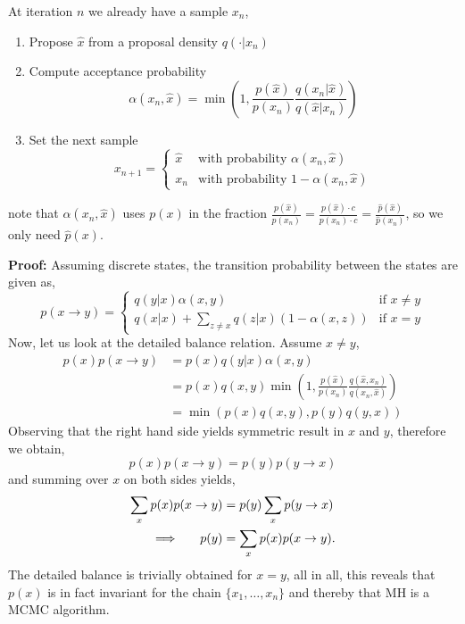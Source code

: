 \begin{testexample}
     At iteration $n$ we already have a sample $x_n$,
    \begin{enumerate}
        \item Propose $\hat x$ from a proposal density $q(\cdot|x_n)$
        \item Compute acceptance probability $$\alpha(x_n,\hat x) = \min \left(1, \frac{p(\hat
        x)}{p(x_n)} \frac{q(x_n| \hat x)}{q(\hat x|x_n)}\right)$$
        \item Set the next sample $$x_{n+1} = \begin{cases}
            \hat x &\text{with probability } \alpha(x_n, \hat x)\\
             x_n &\text{with probability } 1-\alpha(x_n, \hat x)
        \end{cases}$$
    \end{enumerate}
    note that $\alpha(x_n,\hat x)$ uses $p(x)$ in the fraction $\frac{p(\hat x)}{p(x_n)} =
    \frac{p(\hat x)\cdot c}{p(x_n)\cdot c} = \frac{\hat p(\hat x)}{\hat p(x_n)}$, so we only need $\hat
    p(x)$.  
    
    \textbf{Proof:} Assuming discrete states, the transition probability between the states are given as, 
    $$p(x\rightarrow y) = \begin{cases}
        q(y|x)\alpha(x,y) & \text{if } x\neq y\\
        q(x|x) + \sum_{z\neq x} q(z|x)(1-\alpha(x,z)) & \text{if } x=y
    \end{cases}$$
    Now, let us look at the detailed balance relation. Assume $x\neq y$, 
    \begin{align*}
        p(x)p(x\rightarrow y) &= p(x)q(y|x)\alpha(x,y)\\
        &=p(x)q(x,y) \min \left(1, \frac{p(\hat x)}{p(x_n)} \frac{q(\hat x, x_n)}{q(x_n,\hat x)}\right)\\
        &= \min(p(x)q(x,y), p(y)q(y,x))
    \end{align*}
    Observing that the right hand side yields symmetric result in $x$ and $y$, therefore we obtain, 
    $$p(x)p(x\rightarrow y) = p(y)p(y\rightarrow x)$$
    and summing over $x$ on both sides yields,
    \begin{align}
        \sum_x p(x)p(x\rightarrow y) &= p(y) \sum_x p(y\rightarrow x)\\
        \implies \hspace{0.5cm} p(y) &= \sum_x p(x)p(x\rightarrow y).
    \end{align}
     The detailed balance is trivially obtained for $x = y$, all in all, this reveals that $p(x)$ is in fact
     invariant for the chain $\{x_1, \dots , x_n\}$ and thereby that MH is a MCMC algorithm. 
\end{testexample}
